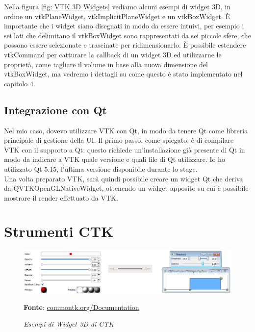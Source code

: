 Nella figura \ref{fig: VTK 3D Widgets} vediamo alcuni esempi di widget 3D, in ordine un vtkPlaneWidget, vtkImplicitPlaneWidget e un vtkBoxWidget. \`E importante che i widget siano disegnati in modo da essere intuivi, per esempio i sei lati che delimitano il vtkBoxWidget sono rappresentati da sei piccole sfere, che possono essere selezionate e trascinate per ridimensionarlo. \`E possibile estendere vtkCommand per catturare la callback di un widget 3D ed utilizzarne le proprietà, come tagliare il volume in base alla nuova dimensione del vtkBoxWidget, ma vedremo i dettagli su come questo è stato implementato nel capitolo 4.

\subsection{Integrazione con Qt}\label{sec:qt-integrazione}
Nel mio caso, dovevo utilizzare VTK con Qt, in modo da tenere Qt come libreria principale di gestione della UI. Il primo passo, come spiegato, è di compilare VTK con il supporto a Qt: questo richiede un'installazione già presente di Qt in modo da indicare a VTK quale versione e quali file di Qt utilizzare. Io ho utilizzato Qt 5.15, l'ultima versione disponibile durante lo stage.\\
Una volta preparato VTK, sarà quindi possibile creare un widget Qt che deriva da QVTKOpenGLNativeWidget, ottenendo un widget apposito su cui è possibile mostrare il render effettuato da VTK.

\section{Strumenti CTK}
\begin{figure}[h]
    \centering
    \includegraphics[scale=0.35]{immagini/volumerendering/ctkwidgets.png}
    \caption{\textit{Esempi di Widget 3D di CTK}}
    \textbf{Fonte}: \href{https://commontk.org/index.php/Documentation/ImageGallery}{commontk.org/Documentation}
    \label{fig: CTK 3D Widgets}
\end{figure}

